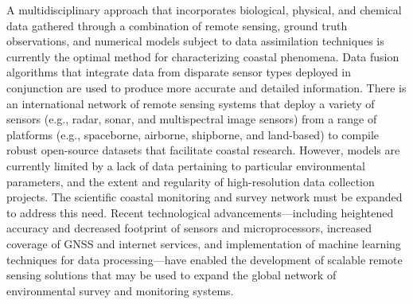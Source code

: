 \documentclass{article}
\begin{document}
\par{A multidisciplinary approach that incorporates biological, physical, and chemical data gathered through a combination of remote sensing, ground truth observations, and numerical models subject to data assimilation techniques is currently the optimal method for characterizing coastal phenomena. Data fusion algorithms that integrate data from disparate sensor types deployed in conjunction are used to produce more accurate and detailed information. There is an international network of remote sensing systems that deploy a variety of sensors (e.g., radar, sonar, and multispectral image sensors) from a range of platforms (e.g., spaceborne, airborne, shipborne, and land-based) to compile robust open-source datasets that facilitate coastal research. However, models are currently limited by a lack of data pertaining to particular environmental parameters, and the extent and regularity of high-resolution data collection projects. The scientific coastal monitoring and survey network must be expanded to address this need. Recent technological advancements---including heightened accuracy and decreased footprint of sensors and microprocessors, increased coverage of GNSS and internet services, and implementation of machine learning techniques for data processing—have enabled the development of scalable remote sensing solutions that may be used to expand the global network of environmental survey and monitoring systems.}

\end{document}
